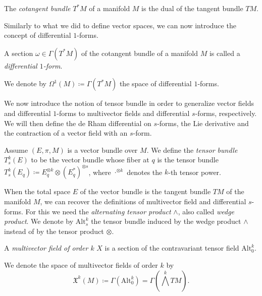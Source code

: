 \begin{definition}
    The \emph{cotangent bundle} $T^*M$ of a manifold $M$ is the dual of the tangent bundle $TM$.
\end{definition}

Similarly to what we did to define vector spaces, we can now introduce the concept of differential $1$-forms.

\begin{definition}
    A section $\omega \in \Gamma(T^*M)$ of the cotangent bundle of a manifold $M$ is called a \emph{differential $1$-form}.
\end{definition}

We denote by $\Omega^1(M) \coloneqq \Gamma(T^*M)$ the space of differential $1$-forms.

We now introduce the notion of tensor bundle in order to generalize vector fields and differential $1$-forms to multivector fields and differential $s$-forms, respectively.
We will then define the de Rham differential on $s$-forms, the Lie derivative and the contraction of a vector field with an $s$-form.

\begin{definition}
    Assume $(E, \pi, M)$ is a vector bundle over $M$.
    We define the \emph{tensor bundle} $T_s ^k (E)$ to be the vector bundle whose fiber at $q$ is the tensor bundle $T_s ^k (E_q) \coloneqq E_q ^{\otimes k} \otimes (E_q ^*) ^{\otimes s}$, where $\cdot^{\otimes k}$ denotes the $k$-th tensor power.
\end{definition}

When the total space $E$ of the vector bundle is the tangent bundle $TM$ of the manifold $M$, we can recover the definitions of multivector field and differential $s$-forms.
For this we need the \emph{alternating tensor product} $\wedge$, also called \emph{wedge product}.
We denote by $\text{Alt}_s ^k$ the tensor bundle induced by the wedge product $\wedge$ instead of by the tensor product $\otimes$.

\begin{definition}
    A \emph{multivector field of order $k$} $X$ is a section of the contravariant tensor field $\text{Alt}_0 ^k$.
\end{definition}

We denote the space of multivector fields of order $k$ by
\begin{equation*}
    \mathfrak{X}^k(M) \coloneqq \Gamma(\text{Alt}_0 ^k) = \Gamma \left( \bigwedge ^k TM \right).
\end{equation*}

